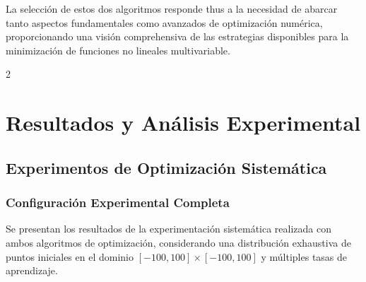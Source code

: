 \documentclass[11pt, a4paper, twocolumn]{beamer}
\begin{document}
La selección de estos dos algoritmos responde thus a la necesidad de abarcar tanto aspectos fundamentales como avanzados de optimización numérica, proporcionando una visión comprehensiva de las estrategias disponibles para la minimización de funciones no lineales multivariable.
\newpage
\begin{multicols}{2}

\section{Resultados y Análisis Experimental}

\subsection{Experimentos de Optimización Sistemática}

\subsubsection{Configuración Experimental Completa}
Se presentan los resultados de la experimentación sistemática realizada con ambos algoritmos de optimización, considerando una distribución exhaustiva de puntos iniciales en el dominio $[-100, 100] \times [-100, 100]$ y múltiples tasas de aprendizaje.
\end{multicols}
\newpage
\end{document}
